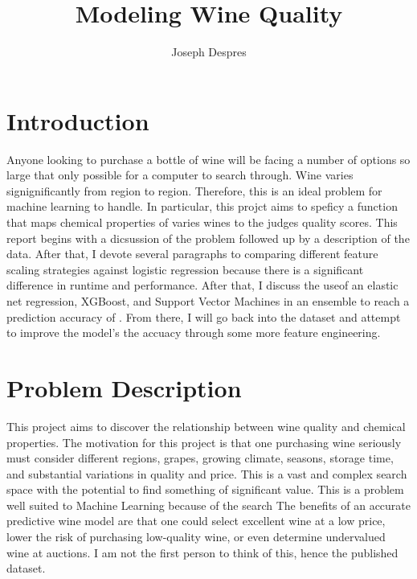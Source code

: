 \documentclass[16pt,twocolumn,letterpaper,titlepage]{article}
\title{Modeling Wine Quality}
\author{
    Joseph Despres
}
\begin{document}
\maketitle


\onecolumn
\tableofcontents
\thispagestyle{empty}
\newpage
\twocolumn


\setcounter{page}{1}

\section{Introduction}


Anyone looking to purchase a bottle of wine will be facing a number of options so large that only possible for a computer to search through. Wine varies signignificantly from region to region. Therefore, this is an ideal problem for machine learning to handle. In particular, this projct aims to speficy a function that maps chemical properties of varies wines to the judges quality scores. This report begins with a dicsussion of the problem followed up by a description of the data. After that, I devote several paragraphs to comparing different feature scaling strategies against logistic regression because there is a significant difference in runtime and performance. After that, I discuss the useof an elastic net regression, XGBoost, and Support Vector Machines in an ensemble to reach a prediction accuracy of . From there, I will go back into the dataset and attempt to improve the model's the accuacy through some more feature engineering. 

\section{Problem Description}

This project aims to discover the relationship between wine quality and chemical properties. The motivation for this project is that one purchasing wine seriously must consider different regions, grapes, growing climate, seasons, storage time, and substantial variations in quality and price. This is a vast and complex search space with the potential to find something of significant value. This is a problem well suited to Machine Learning because of the search The benefits of an accurate predictive wine model are that one could select excellent wine at a low price, lower the risk of purchasing low-quality wine, or even determine undervalued wine at auctions. I am not the first person to think of this, hence the published dataset.
\end{document}
